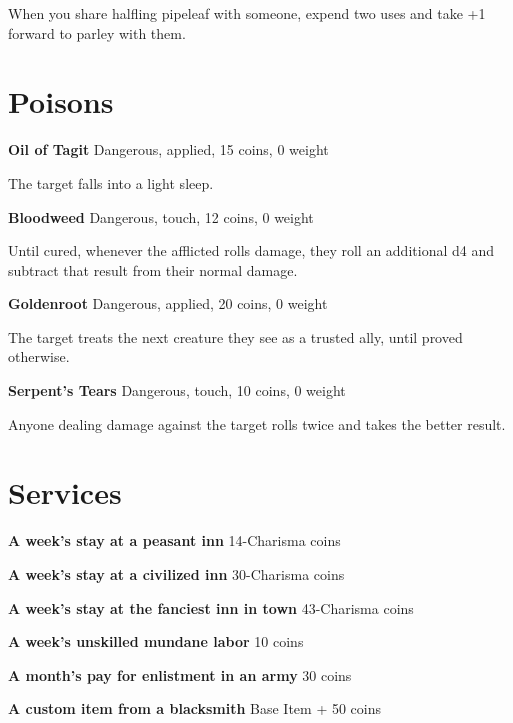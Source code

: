When you share halfling pipeleaf with someone, expend two uses and take +1 forward to parley with them.
\section*{Poisons}

{\noindent \bfseries Oil of Tagit} \hspace*{\fill} Dangerous, applied, 15 coins, 0 weight

The target falls into a light sleep.

{\noindent \bfseries Bloodweed} \hspace*{\fill} Dangerous, touch, 12 coins, 0 weight

Until cured, whenever the afflicted rolls damage, they roll an additional d4 and subtract that result from their normal damage.

{\noindent \bfseries Goldenroot} \hspace*{\fill} Dangerous, applied, 20 coins, 0 weight

The target treats the next creature they see as a trusted ally, until proved otherwise.

{\noindent \bfseries Serpent's Tears} \hspace*{\fill} Dangerous, touch, 10 coins, 0 weight

Anyone dealing damage against the target rolls twice and takes the better result.
\section*{Services}

{\noindent \bfseries A week's stay at a peasant inn} \hspace*{\fill} 14-Charisma coins

{\noindent \bfseries A week's stay at a civilized inn} \hspace*{\fill} 30-Charisma coins

{\noindent \bfseries A week's stay at the fanciest inn in town} \hspace*{\fill} 43-Charisma coins

{\noindent \bfseries A week's unskilled mundane labor} \hspace*{\fill} 10 coins

{\noindent \bfseries A month's pay for enlistment in an army} \hspace*{\fill} 30 coins

{\noindent \bfseries A custom item from a blacksmith} \hspace*{\fill} Base Item + 50 coins


